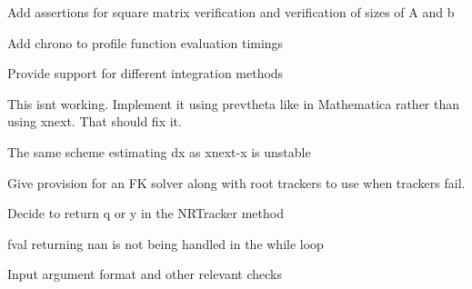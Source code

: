 
\begin{DoxyRefList}
\item[Member \mbox{\hyperlink{utils_8h_a7ed506e6d7b8ba153e1b8b24a7b6e5c4}{linear\+Solve}} (Matrix\+Xd Amat, Vector\+Xd bvec)]\label{todo__todo000005}%
%
Add assertions for square matrix verification and verification of sizes of A and b  
\item[Class \mbox{\hyperlink{classRootTracker}{Root\+Tracker}} ]\label{todo__todo000004}%
%
Add chrono to profile function evaluation timings  
\item[Member \mbox{\hyperlink{classRootTracker_acc5d4b8e89ace70cee9c227f033e5a92}{Root\+Tracker::D\+M\+Tracker}} (Vector\+Xd xprev, Vector\+Xd x, Vector\+Xd y, std\+::function$<$ Matrix\+Xd(\+Vector\+Xd)$>$ Jfx, std\+::function$<$ Matrix\+Xd(\+Vector\+Xd)$>$ Jfy, double eps=0, std\+::function$<$ Vector\+Xd(\+Vector\+Xd)$>$ f=N\+U\+LL)]\label{todo__todo000003}%
%
Provide support for different integration methods 

This isnt working. Implement it using prevtheta like in Mathematica rather than using xnext. That should fix it. 

The same scheme estimating dx as xnext-\/x is unstable  
\item[Member \mbox{\hyperlink{classRootTracker_a89ffd1af75e3bf434065b736623bbf17}{Root\+Tracker::methods}} ()]\label{todo__todo000001}%
%
Give provision for an FK solver along with root trackers to use when trackers fail.  
\item[Member \mbox{\hyperlink{classRootTracker_a6bb3dcb73ea58ac44ab15d7803de3d5a}{Root\+Tracker::N\+R\+Tracker}} (Vector\+Xd x, Vector\+Xd y, std\+::function$<$ Vector\+Xd(\+Vector\+Xd)$>$ f, std\+::function$<$ Matrix\+Xd(\+Vector\+Xd)$>$ Jfy, double eps=pow(10, -\/10))]\label{todo__todo000002}%
%
Decide to return q or y in the N\+R\+Tracker method 

fval returning nan is not being handled in the while loop 

Input argument format and other relevant checks 
\end{DoxyRefList}